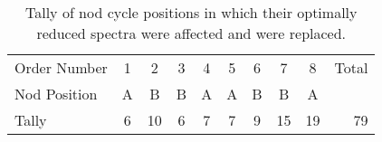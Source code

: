 \begin{table}
    \centering
    \caption{Tally of nod cycle positions in which their optimally reduced spectra were affected and were replaced.}
    \begin{tabular}{lccccccccr}
        \toprule
        Order Number & 1 & 2 & 3 & 4 & 5 & 6 & 7 & 8 &Total\\
        Nod Position & A & B & B & A & A & B & B & A & \\
        \midrule
        Tally & 6 & 10 & 6 & 7 & 7 & 9 & 15 & 19 & 79\\
        \bottomrule
    \end{tabular}\label{tab:nod_artefact_tally}
\end{table}